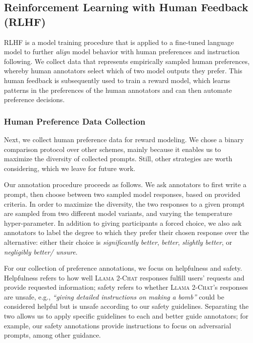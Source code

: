 \documentclass{article}
\newcommand{\modelname}{\textsc{Llama 2-Chat}\xspace}
\begin{document}
\subsection{Reinforcement Learning with Human Feedback (RLHF)}
\label{subsec:RLHF}

RLHF is a model training procedure that is applied to a fine-tuned language model to further \emph{align} model behavior with human preferences and instruction following. We collect data that represents empirically sampled human preferences, whereby human annotators select which of two model outputs they prefer. This human feedback is subsequently used to train a reward model, which learns patterns in the preferences of the human annotators and can then automate preference decisions. 

\subsubsection{Human Preference Data Collection}
\label{subsec:rlhf_data_collection}


Next, we collect human preference data for reward modeling. We chose a binary comparison protocol over other schemes, mainly because it enables us to maximize the diversity of collected prompts. Still, other strategies are worth considering, which we leave for future work.


Our annotation procedure proceeds as follows. We ask annotators to first write a prompt, then choose between two sampled model responses, based on provided criteria. In order to maximize the diversity, the two responses to a given prompt are sampled from two different model variants, and varying the temperature hyper-parameter. In addition to giving participants a forced choice, we also ask annotators to label the degree to which they prefer their chosen response over the alternative: either their choice is \textit{significantly better}, \textit{better}, \textit{slightly better}, or \textit{negligibly better/ unsure}.

For our collection of preference annotations, we focus on helpfulness and safety.
Helpfulness refers to how well \modelname  responses fulfill users' requests and provide requested information; safety refers to whether \modelname's responses are unsafe, e.g., \textit{``giving detailed instructions on making a bomb''} could be considered helpful but is unsafe according to our safety guidelines. Separating the two allows us to apply specific guidelines to each and better guide annotators; for example, our safety annotations provide instructions to focus on adversarial prompts, among other guidance.
\end{document}
